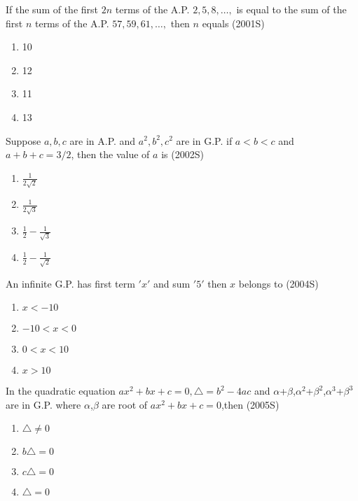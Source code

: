\item If the sum of the first $2n$ terms of the A.P. $2,5,8,\dots,$ is equal to the sum of the first $n$ terms of the A.P. $ 57,59,61,\dots,$ then $n$ equals \hfill(2001S)
       \begin{multicols}{4}
        \begin{enumerate}
            \item 10
            \item 12
            \item 11
            \item 13
            \end{enumerate}
            \end{multicols}
\item Suppose $a,b,c$ are in A.P. and $a^2,b^2,c^2$ are in G.P. if $a<b<c$ and $a+b+c=3/2$, then the value of $a$ is \hfill(2002S)
            \begin{multicols}{4}
            \begin{enumerate}
             \item $\frac{1}{2\sqrt{2}}$
             \item $\frac{1}{2\sqrt{3}}$
             \item $\frac{1}{2}-\frac{1}{\sqrt{3}}$
             \item $\frac{1}{2}-\frac{1}{\sqrt{2}}$
            \end{enumerate}
            \end{multicols}
\item An infinite G.P. has first term $'x'$ and sum $'5'$ then $x$ belongs to \hfill(2004S)
            \begin{multicols}{4}
            \begin{enumerate}
                \item $x<-10$
                \item $-10<x<0$
                \item $0<x<10$
                \item $x>10$
                \end{enumerate}
                \end{multicols}
\item In the quadratic equation $ax^2+bx+c=0,\triangle=b^2-4ac$ and $\alpha$+$\beta$,$\alpha^2$+$\beta^2$,$\alpha^3$+$\beta^3$ are in G.P. where $\alpha$,$\beta $ are root of $ax^2+bx+c=0$,then \hfill(2005S)
                \begin{multicols}{4}
                \begin{enumerate}
                    \item $\triangle\neq0$
                    \item $b\triangle=0$
                    \item $c\triangle=0$
                    \item $\triangle=0$
                \end{enumerate}
                \end{multicols}
